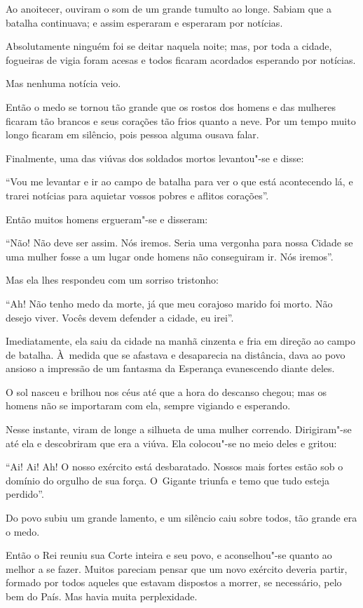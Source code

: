 Ao anoitecer, ouviram o som de um grande tumulto ao longe. Sabiam que a
batalha continuava; e assim esperaram e esperaram por notícias.

Absolutamente ninguém foi se deitar naquela noite; mas, por toda a
cidade, fogueiras de vigia foram acesas e todos ficaram acordados
esperando por notícias.

Mas nenhuma notícia veio.

Então o medo se tornou tão grande que os rostos dos homens e das
mulheres ficaram tão brancos e seus corações tão frios quanto a neve.
Por um tempo muito longo ficaram em silêncio, pois pessoa alguma ousava
falar.

Finalmente, uma das viúvas dos soldados mortos levantou"-se e disse:

``Vou me levantar e ir ao campo de batalha para ver o que está
acontecendo lá, e trarei notícias para aquietar vossos pobres e aflitos
corações''.

Então muitos homens ergueram"-se e disseram:

``Não! Não deve ser assim. Nós iremos. Seria uma vergonha para nossa
Cidade se uma mulher fosse a um lugar onde homens não conseguiram ir.
Nós iremos''.

Mas ela lhes respondeu com um sorriso tristonho:

``Ah! Não tenho medo da morte, já que meu corajoso marido foi morto. Não
desejo viver. Vocês devem defender a cidade, eu irei''.

Imediatamente, ela saiu da cidade na manhã cinzenta e fria em direção ao
campo de batalha. À~medida que se afastava e desaparecia na distância,
dava ao povo ansioso a impressão de um fantasma da Esperança evanescendo
diante deles.

O sol nasceu e brilhou nos céus até que a hora do descanso chegou; mas
os homens não se importaram com ela, sempre vigiando e esperando.

Nesse instante, viram de longe a silhueta de uma mulher correndo.
Dirigiram"-se até ela e descobriram que era a viúva. Ela colocou"-se no
meio deles e gritou:

``Ai! Ai! Ah! O nosso exército está desbaratado. Nossos mais fortes
estão sob o domínio do orgulho de sua força. O~Gigante triunfa e temo
que tudo esteja perdido''.

Do povo subiu um grande lamento, e um silêncio caiu sobre todos, tão
grande era o medo.

Então o Rei reuniu sua Corte inteira e seu povo, e aconselhou"-se quanto
ao melhor a se fazer. Muitos pareciam pensar que um novo exército
deveria partir, formado por todos aqueles que estavam dispostos a
morrer, se necessário, pelo bem do País. Mas havia muita perplexidade.

